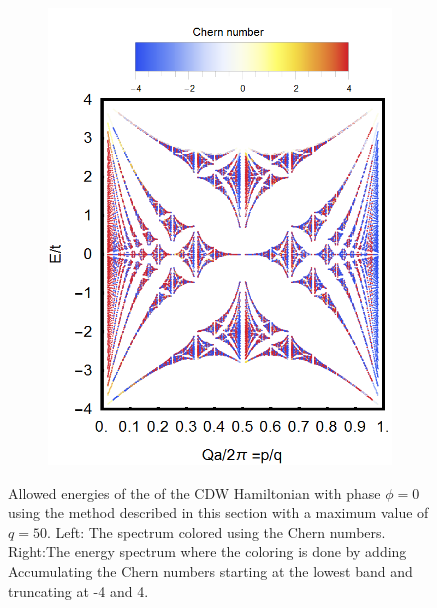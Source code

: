 \documentclass[letterpaper, 10 pt, conference]{ieeeconf}  %
\begin{document}
\begin{figure}[tbph]
\begin{subfigure}{.1\linewidth}
\includegraphics{butterfly50ChernAccuTotal.png}
\label{fig:sub2}
\end{subfigure}
\caption{Allowed energies of the of the CDW Hamiltonian with phase $\phi = 0$ using the method described in this section with a  maximum value of $q = 50$.
Left: The spectrum colored using the Chern numbers.
Right:The energy spectrum where the coloring is done by adding Accumulating the Chern numbers starting at the lowest band and truncating at -4 and 4.}
\end{figure}
\end{document}
